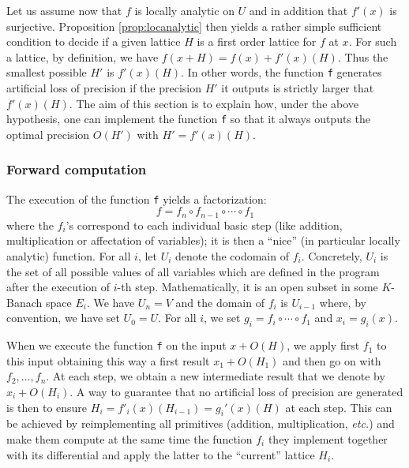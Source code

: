 \documentclass{lms}
\begin{document}
Let us assume now that $f$ is locally analytic on $U$ and in addition 
that $f'(x)$ is surjective. Proposition \ref{prop:locanalytic} then 
yields a rather simple sufficient condition to decide if a given lattice 
$H$ is a first order lattice for $f$ at $x$. For such a lattice, by 
definition, we have $f(x+H) = f(x) + f'(x)(H)$. Thus the smallest 
possible $H'$ is $f'(x)(H)$. In other words, the function {\tt f} 
generates artificial loss of precision if the precision $H'$ it outputs 
is strictly larger that $f'(x)(H)$. The aim of this section is to 
explain how, under the above hypothesis, one can implement the function 
{\tt f} so that it always outputs the optimal precision $O(H')$ with $H' 
= f'(x)(H)$.

\subsubsection*{Forward computation}

The execution of the function {\tt f} yields a factorization:
$$f = f_n \circ f_{n-1} \circ \cdots \circ f_1$$
where the $f_i$'s correspond to each individual basic step (like 
addition, multiplication or affectation of variables); it is then a
``nice'' (in particular locally analytic) function. For all 
$i$, let $U_i$ denote the codomain of $f_i$. Concretely, $U_i$ is the 
set of all possible values of all variables which are defined in the 
program after the execution of $i$-th step. Mathematically, it is an 
open subset in some $K$-Banach space $E_i$. We have $U_n = V$ and the 
domain of $f_i$ is $U_{i-1}$ where, by convention, we have set $U_0 = 
U$.
For all $i$, we set $g_i = f_i \circ \cdots \circ f_1$ and $x_i = 
g_i(x)$. 

When we execute the function {\tt f} on the input $x + O(H)$, we apply 
first $f_1$ to this input obtaining this way a first result $x_1 + 
O(H_1)$ and then go on with $f_2, \ldots, f_n$. At each step, we obtain 
a new intermediate result that we denote by $x_i + O(H_i)$. A way to 
guarantee that no artificial loss of precision are generated is then to 
ensure $H_i = f'_i(x)(H_{i-1}) = g_i'(x)(H)$ at each step. This can be 
achieved by reimplementing all primitives (addition, multiplication, 
\emph{etc.}) and make them compute at the same time the function $f_i$
they implement together with its differential and apply the latter to
the ``current'' lattice $H_i$.
\end{document}
